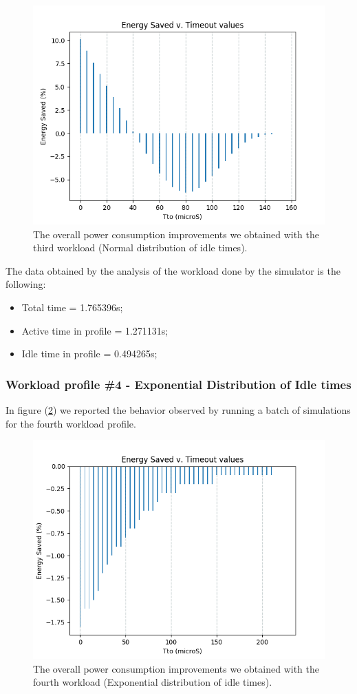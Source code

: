 \documentclass[a4paper]{article}
\begin{document}
            \begin{figure}[htp]
                \centering
                \includegraphics[width=0.6 \columnwidth]{./screenshots/Idle_case3.png}
                \caption{
                        \label{fig:Idle_case3}
                        The overall power consumption improvements we obtained with the third workload (Normal distribution of idle times).
                }
            \end{figure}

            The data obtained by the analysis of the workload done by the simulator is the following:
            \begin{itemize}
                \item Total time = 1.765396s;
                \item Active time in profile = 1.271131s;
                \item Idle time in profile = 0.494265s;
            \end{itemize}

        \subsubsection{Workload profile \#4 - Exponential Distribution of Idle times}
            In figure (\ref{fig:Idle_case4}) we reported the behavior observed by running a batch of simulations for the fourth workload profile.

            \begin{figure}[htp]
                \centering
                \includegraphics[width=0.6 \columnwidth]{./screenshots/Idle_case4.png}
                \caption{
                        \label{fig:Idle_case4}
                        The overall power consumption improvements we obtained with the fourth workload (Exponential distribution of idle times).
                }
            \end{figure}
\end{document}

